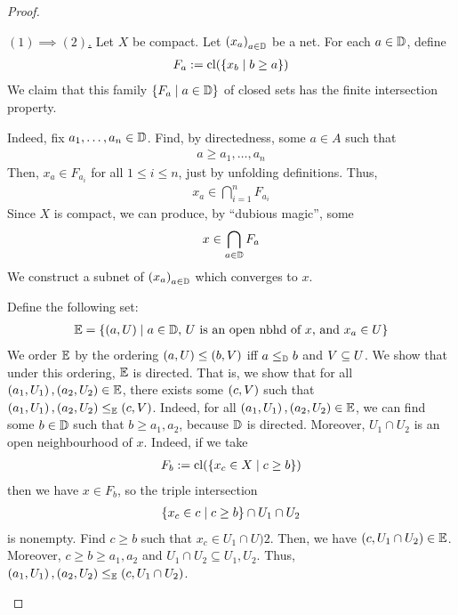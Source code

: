 \begin{proof}
\begin{description}
        \underline{$(1) \implies (2)$.}
        Let $X$ be compact. Let $\left( x_a \right)_{a \in \mathbb{D}}$ be a net. For each $a \in \mathbb{D}$, define
        \begin{align*}
            F_a := \operatorname{cl}\!\left( \left\{ x_b \; \middle\vert \; b \geq a \right\} \right)
        \end{align*}
        We claim that this family $\left\{ F_a \; \middle\vert \; a \in \mathbb{D} \right\}$ of closed sets has the finite intersection property.

        Indeed, fix $a_1, \ldots, a_n \in \mathbb{D}$. Find, by directedness, some $a \in A$ such that
        \begin{align*}
            a \geq a_1, \ldots, a_n
        \end{align*}
        Then, $x_a \in F_{a_i}$ for all $1 \leq i \leq n$, just by unfolding definitions. Thus,
        \begin{align*}
            x_a \in \bigcap_{i=1}^{n} F_{a_i}
        \end{align*}
        Since $X$ is compact, we can produce, by ``dubious magic'', some
        \begin{align*}
            x \in \bigcap_{a \in \mathbb{D}} F_a
        \end{align*}
        We construct a subnet of $\left( x_a \right)_{a \in \mathbb{D}}$ which converges to $x$.

        Define the following set:
        \begin{align*}
            \mathbb{E} = \left\{ \left( a, U \right) \; \middle\vert \; a \in \mathbb{D}\text{, } U \text{ is an open nbhd of $x$, and } x_a \in U \right\}
        \end{align*}
        We order $\mathbb{E}$ by the ordering $\left( a, U \right) \leq \left( b, V \right)$ iff $a \leq_{\mathbb{D}} b$ and $V \subseteq U$. We show that under this ordering, $\mathbb{E}$ is directed. That is, we show that for all $\left( a_1, U_1 \right), \left( a_2, U_2 \right) \in \mathbb{E}$, there exists some $\left( c, V \right)$ such that $\left( a_1, U_1 \right), \left( a_2, U_2 \right) \leq_{\mathbb{E}} \left( c, V \right)$. Indeed, for all $\left( a_1, U_1 \right), \left( a_2, U_2 \right) \in \mathbb{E}$, we can find some $b \in \mathbb{D}$ such that $b \geq a_1, a_2$, because $\mathbb{D}$ is directed. Moreover, $U_1 \cap U_2$ is an open neighbourhood of $x$. Indeed, if we take
        \begin{align*}
            F_b := \operatorname{cl}\!\left( \left\{ x_c \in X \; \middle\vert \; c \geq b \right\} \right)
        \end{align*}
        then we have $x \in F_b$, so the triple intersection
        \begin{align*}
            \left\{ x_c \in c \; \middle\vert \; c \geq b \right\} \cap U_1 \cap U_2
        \end{align*}
        is nonempty. Find $c \geq b$ such that $x_c \in U_1 \cap U)2$. Then, we have $\left( c, U_1 \cap U_2 \right) \in \mathbb{E}$. Moreover, $c \geq b \geq a_1, a_2$ and $U_1 \cap U_2 \subseteq U_1, U_2$. Thus, $\left( a_1, U_1 \right), \left( a_2, U_2 \right) \leq_{\mathbb{E}} \left( c, U_1 \cap U_2 \right)$.


\end{description}
\end{proof}
